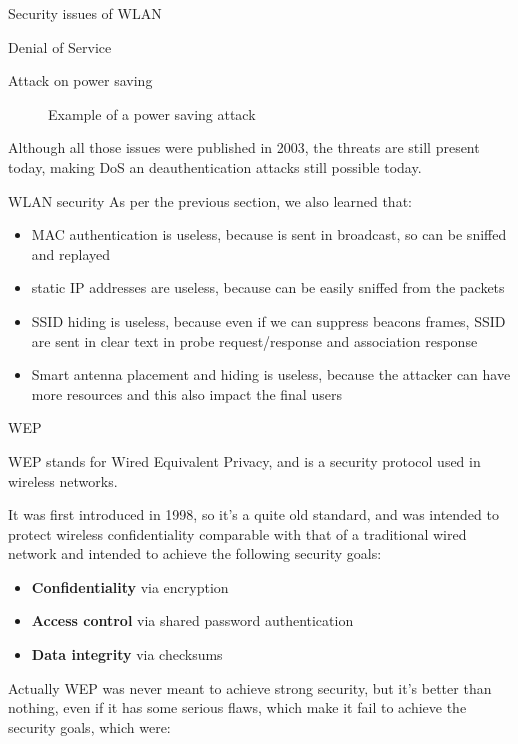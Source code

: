 \begin{section}{Security issues of WLAN}
\begin{subsection}{Denial of Service}
\begin{subsubsection}{Attack on power saving}
\begin{figure}[h]
        \caption{Example of a power saving attack}
      \end{figure}

    \end{subsubsection}

  \end{subsection}
  Although all those issues were published in 2003, the threats are still present today, making DoS 
  an deauthentication attacks still possible today.

\end{section}
\begin{section}{WLAN security}
    As per the previous section, we also learned that:
    \begin{itemize}
      \item MAC authentication is useless, because is sent in broadcast, so can be sniffed and replayed
      \item static IP addresses are useless, because can be easily sniffed from the packets
      \item SSID hiding is useless, because even if we can suppress beacons frames, SSID are sent 
        in clear text in probe request/response and association response
      \item Smart antenna placement and hiding is useless, because the attacker can have more resources 
        and this also impact the final users
    \end{itemize}
  \begin{subsection}{WEP}
    \begin{boxH}
      WEP stands for Wired Equivalent Privacy, and is a security protocol used in wireless networks.
    \end{boxH}
    It was first introduced in 1998, so it's a quite old standard, and was intended to protect 
    wireless confidentiality comparable with that of a traditional wired network and intended to 
    achieve the following security goals:
    \begin{itemize}
      \item \textbf{Confidentiality} via encryption 
      \item \textbf{Access control} via shared password authentication
      \item \textbf{Data integrity} via checksums
    \end{itemize}
    Actually WEP was never meant to achieve strong security, but it's better than nothing, even if 
    it has some serious flaws, which make it fail to achieve the security goals, which were:

\end{subsection}
\end{section}
